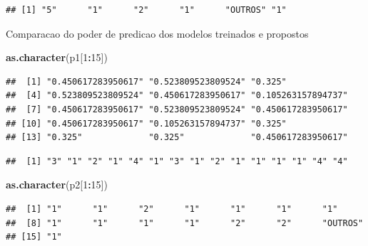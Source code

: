 \documentclass[]{article}
\newenvironment{Shaded}{\begin{snugshade}}{\end{snugshade}}
\newcommand{\DecValTok}[1]{\textcolor[rgb]{0.00,0.00,0.81}{#1}}
\newcommand{\KeywordTok}[1]{\textcolor[rgb]{0.13,0.29,0.53}{\textbf{#1}}}
\newcommand{\NormalTok}[1]{#1}
\newcommand{\OperatorTok}[1]{\textcolor[rgb]{0.81,0.36,0.00}{\textbf{#1}}}
\begin{document}
\begin{Shaded}
\end{Shaded}

\begin{verbatim}
## [1] "5"      "1"      "2"      "1"      "OUTROS" "1"
\end{verbatim}

Comparacao do poder de predicao dos modelos treinados e propostos

\begin{Shaded}
\begin{Highlighting}[]
\KeywordTok{as.character}\NormalTok{(p1[}\DecValTok{1}\OperatorTok{:}\DecValTok{15}\NormalTok{])}
\end{Highlighting}
\end{Shaded}

\begin{verbatim}
##  [1] "0.450617283950617" "0.523809523809524" "0.325"            
##  [4] "0.523809523809524" "0.450617283950617" "0.105263157894737"
##  [7] "0.450617283950617" "0.523809523809524" "0.450617283950617"
## [10] "0.450617283950617" "0.105263157894737" "0.325"            
## [13] "0.325"             "0.325"             "0.450617283950617"
\end{verbatim}

\begin{Shaded}
\end{Shaded}

\begin{verbatim}
##  [1] "3" "1" "2" "1" "4" "1" "3" "1" "2" "1" "1" "1" "1" "4" "4"
\end{verbatim}

\begin{Shaded}
\begin{Highlighting}[]
\KeywordTok{as.character}\NormalTok{(p2[}\DecValTok{1}\OperatorTok{:}\DecValTok{15}\NormalTok{])}
\end{Highlighting}
\end{Shaded}

\begin{verbatim}
##  [1] "1"      "1"      "2"      "1"      "1"      "1"      "1"     
##  [8] "1"      "1"      "1"      "1"      "2"      "2"      "OUTROS"
## [15] "1"
\end{verbatim}
\end{document}
